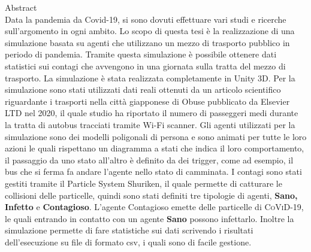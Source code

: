 \documentclass {article}
\begin{document}
	
	\preparefrontpagestandard
	\Large{Abstract\\ Data la pandemia da Covid-19, si sono dovuti effettuare vari studi e ricerche sull'argomento in ogni ambito. Lo scopo di questa tesi è la realizzazione di una simulazione basata su agenti che utilizzano un mezzo di trasporto pubblico in periodo di pandemia. Tramite questa simulazione è possibile ottenere dati statistici sui contagi che avvengono in una giornata sulla tratta del mezzo di trasporto. La simulazione è stata realizzata completamente in Unity 3D. Per la simulazione sono stati utilizzati dati reali ottenuti da un articolo scientifico riguardante i trasporti nella città giapponese di Obuse pubblicato da Elsevier LTD nel 2020, il quale studio ha riportato il numero di passeggeri medi durante la tratta di autobus tracciati tramite Wi-Fi scanner. Gli agenti utilizzati per la simulazione sono dei modelli poligonali di persona e sono animati per tutte le loro azioni le quali rispettano un diagramma a stati che indica il loro comportamento, il passaggio da uno stato all'altro è definito da dei trigger, come ad esempio, il bus che si ferma fa andare l'agente nello stato di camminata. I contagi sono stati gestiti tramite il Particle System Shuriken, il quale permette di catturare le collisioni delle particelle, quindi sono stati definiti tre tipologie di agenti, \textbf{Sano, Infetto} e \textbf{Contagioso}. L'agente Contagioso emette delle particelle di \textsc{CoViD-19}, le quali entrando in contatto con un agente \textbf{Sano} possono infettarlo. Inoltre la simulazione permette di fare statistiche sui dati scrivendo i risultati dell'esecuzione su file di formato csv, i quali sono di facile gestione.
}
	
\end{document}
